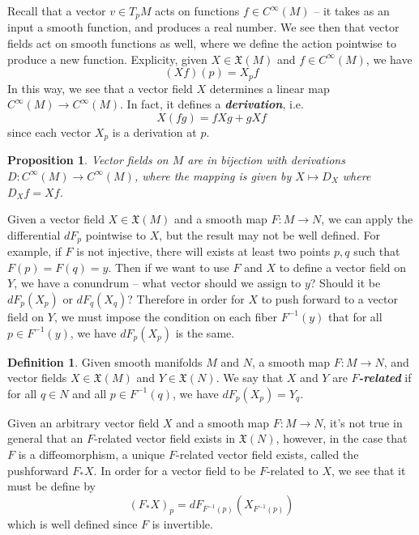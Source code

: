 \documentclass[psamsfonts]{amsart}
\newtheorem{prop}[thm]{Proposition}
\theoremstyle{definition}
\newtheorem{defn}[thm]{Definition}
\theoremstyle{remark}
\newcommand{\ib}[1]{\textbf{\textit{#1}}}
\newcommand{\inv}{^{-1}}
\begin{document}
Recall that a vector $v \in T_pM$ acts on functions $f \in C^\infty(M)$ -- it
takes as an input a smooth function, and produces a real number. We see then
that vector fields act on smooth functions as well, where we define the action
pointwise to produce a new function. Explicity, given $X \in \mathfrak{X}(M)$
and $f \in C^\infty(M)$, we have
\[
(Xf)(p) = X_pf
\]
In this way, we see that a vector field $X$ determines a linear map
$C^\infty(M) \to C^\infty(M)$. In fact, it defines a \ib{derivation},
i.e.
\[
X(fg) = fXg + gXf
\]
since each vector $X_p$ is a derivation at $p$.
%
\begin{prop}
Vector fields on $M$ are in bijection with derivations $D: C^\infty(M) \to C^\infty(M)$,
where the mapping is given by $X \mapsto D_X$ where $D_Xf = Xf$.
\end{prop}
%
Given a vector field $X \in \mathfrak{X}(M)$ and a smooth map $F : M \to N$,
we can apply the differential $dF_p$ pointwise to $X$, but the result may
not be well defined. For example, if $F$ is not injective, there will
exists at least two points $p,q$ such that $F(p) = F(q) = y$. Then if we want
to use $F$ and $X$ to define a vector field on $Y$, we have a conundrum --
what vector should we assign to $y$? Should it be $dF_p(X_p)$ or $dF_q(X_q)$?
Therefore in order for $X$ to push forward to a vector field on $Y$, we must
impose the condition on each fiber $F\inv(y)$ that for all $p \in F\inv(y)$,
we have $dF_p(X_p)$ is the same.
%
\begin{defn}
Given smooth manifolds $M$ and $N$, a smooth map $F: M \to N$, and vector
fields $X \in \mathfrak{X}(M)$ and $Y \in \mathfrak{X}(N)$. We say that
$X$ and $Y$ are \ib{$F$-related} if for all $q \in N$ and all $p \in F\inv(q)$,
we have $dF_p(X_p) = Y_q$.
\end{defn}
%
Given an arbitrary vector field $X$ and a smooth map $F: M \to N$, it's not true
in general that an $F$-related vector field exists in $\mathfrak{X}(N)$, however,
in the case that $F$ is a diffeomorphism, a unique $F$-related vector field
exists, called the pushforward $F_*X$. In order for a vector field to be $F$-related
to $X$, we see that it must be define by
\[
(F_*X)_p = dF_{F\inv(p)}(X_{F\inv(p)})
\]
which is well defined since $F$ is invertible.
%
\end{document}
